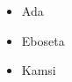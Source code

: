\documentclass{article}
\begin{document}
  
  
   	\begin{itemize}
   		\item Ada
   		\item Eboseta
   		\item Kamsi
   		\end{itemize}
   	
   	
   
\end{document}
